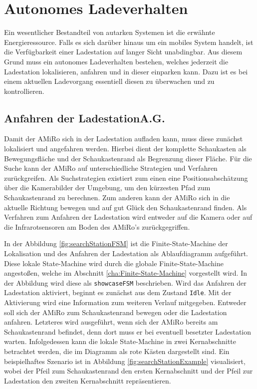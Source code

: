 \chapter[Autonomes Ladeverhalten]{Autonomes Ladeverhalten \hfill{}} \label{kap:AutonomesLadeverhalten}
Ein wesentlicher Bestandteil von autarken Systemen ist die erwähnte Energieressource. Falls es sich darüber hinaus um ein mobiles System handelt, ist die Verfügbarkeit einer Ladestation auf langer Sicht unabdingbar. Aus diesem Grund muss ein autonomes Ladeverhalten bestehen, welches jederzeit die Ladestation lokalisieren, anfahren und in dieser einparken kann. Dazu ist es bei einem aktuellen Ladevorgang essentiell diesen zu überwachen und zu kontrollieren.

\section[Anfahren der Ladestation]{Anfahren der Ladestation\hfill {\normalsize A.G.}} \label{cha:Anfahren der Ladestation} %
Damit der AMiRo sich in der Ladestation aufladen kann, muss diese zunächst lokalisiert und angefahren werden. Hierbei dient der komplette Schaukasten als Bewegungsfläche und der Schaukastenrand als Begrenzung dieser Fläche. Für die Suche kann der AMiRo auf unterschiedliche Strategien und Verfahren zurückgreifen. Als Suchstrategien existiert zum einen eine Positionsabschätzung über die Kamerabilder der Umgebung, um den kürzesten Pfad zum Schaukastenrand zu berechnen. Zum anderen kann der AMiRo sich in die aktuelle Richtung bewegen und auf gut Glück den Schaukastenrand finden. Als Verfahren zum Anfahren der Ladestation wird entweder auf die Kamera oder auf die Infrarotsensoren am Boden des AMiRo's zurückgegriffen.

In der Abbildung \ref{fig:searchStationFSM} ist die Finite-State-Machine der Lokalisation und des Anfahren der Ladestation als Ablaufdiagramm aufgeführt. Diese lokale State-Machine wird durch die globale Finite-State-Machine angestoßen, welche im Abschnitt \ref{cha:Finite-State-Machine} vorgestellt wird. In der Abbildung wird diese als \texttt{showcaseFSM} beschrieben. Wird das Anfahren der Ladestation aktiviert, beginnt es zunächst aus dem Zustand \texttt{Idle}. Mit der Aktivierung wird eine Information zum weiteren Verlauf mitgegeben. Entweder soll sich der AMiRo zum Schaukastenrand bewegen oder die Ladestation anfahren. Letzteres wird ausgeführt, wenn sich der AMiRo bereits am Schaukastenrand befindet, denn dort muss er bei eventuell besetzter Ladestation warten. Infolgedessen kann die lokale State-Machine in zwei Kernabschnitte betrachtet werden, die im Diagramm als rote Kästen dargestellt sind. Ein beispielhaftes Szenario ist in Abbildung \ref{fig:searchStationExample} visualisiert, wobei der Pfeil zum Schaukastenrand den ersten Kernabschnitt und der Pfeil zur Ladestation den zweiten Kernabschnitt repräsentieren.

